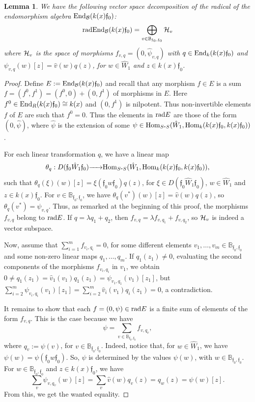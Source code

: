 \documentclass{article}
\newtheorem{lemma}[theorem]{Lemma}
\theoremstyle{definition}
\newcommand{\End}{{ \rm End }}
\newcommand{\Hom}{{ \rm Hom }}
\newcommand{\rad}{{ \rm rad }}
\renewcommand{\frak}{\mathfrak}
\newcommand{\g}{\hbox{-}}
\newcommand{\hueca}[1]{\mathbb{#1}}
\newcommand{\rightmap}[1]{\smash{\mathop{\hbox to 
20pt{\rightarrowfill}}\limits^{#1}}}
\begin{document}
\begin{lemma}\label{L: radEnd(k(x)f0}
We have the following vector space decomposition of the radical of the endomorphism algebra $\End_{\cal B}(k(x)\frak{f}_0)$:
$$\rad\End_{\cal B}(k(x)\frak{f}_0)=\bigoplus_{v\in \hueca{B}_{\frak{f}_0,\frak{f}_0}}{\cal H}_v$$
where ${\cal H}_v$ is the space of morphisms $f_{v,q}=(0,\hat{\psi}_{v,q})$ with $q\in \End_k(k(x)\frak{f}_0)$ and $\psi_{v,q}(w)[z]=\hat{v}(w)q(z)$, for $w\in \hat{W}_1$ and $z\in k(x)\frak{f}_0$. 
\end{lemma}

\begin{proof} Define $E:=\End_{\cal B}(k(x)\frak{f}_0)$  and  recall that any morphism $f\in E$ is a sum $f=(f^0,f^1)=(f^0,0)+(0,f^1)$ of morphisms in $E$. Here $f^0\in \End_R(k(x)\frak{f}_0)\cong k(x)$ and $(0,f^1)$ is nilpotent. 
Thus non-invertible elements $f$ of $E$ are such that $f^0=0$.  Thus the elements in $\rad E$ are those of the form $(0,\hat{\psi})$, where $\hat{\psi}$ is the extension of some $\psi\in \Hom_{S\g S}(\hat{W}_1,\Hom_k(k(x)\frak{f}_0,k(x)\frak{f}_0))$.  

For each linear transformation $q$, we have a linear map 
$$\theta_q:D(\frak{f}_0\hat{W}_1\frak{f}_0)\rightmap{}\Hom_{S\g S}(\hat{W}_1,\Hom_k(k(x)\frak{f}_0,k(x)\frak{f}_0)),$$
  such that $\theta_q(\xi)(w)[z]=\xi(\frak{f}_0w\frak{f}_0)q(z)$, for $\xi\in D(\frak{f}_0\hat{W}_1\frak{f}_0)$, $w\in \hat{W}_1$ and $z\in k(x)\frak{f}_0$. For $v\in \hueca{B}_{\frak{f}_0,\frak{f}_0}$, 
  we have $\theta_q(v^*)(w)[z]=\hat{v}(w)q(z)$, so $\theta_q(v^*)=\psi_{v,q}$. 
Thus, as remarked at the beginning of this proof, the morphisms $f_{v,q}$ belong to $\rad E$. If $q=\lambda q_1+q_2$, then $f_{v,q}=\lambda f_{v,q_1}+f_{v,q_2}$, so ${\cal H}_v$ is indeed a vector subspace. 

Now, assume that $\sum_{i=1}^mf_{v_i,q_i}=0$, for some different elements $v_1,\ldots,v_m\in \hueca{B}_{\frak{f}_0,\frak{f}_0}$ and some non-zero linear maps $q_1,\ldots,q_m$. If $q_1(z_1)\not=0$,  evaluating the second components of the morphisms $f_{v_i,q_i}$ in $v_1$, we obtain 
$0\not=q_1(z_1)=\hat{v}_1(v_1)q_1(z_1)=\psi_{v_1,q_1}(v_1)[z_1]$, but
 $\sum_{i=2}^m\psi_{v_i,q_i}(v_1)[z_1]
=\sum_{i=2}^m\hat{v}_i(v_1)q_i(z_1)=0$, a contradiction.  

It remains to show that each $f=(0,\psi)\in \rad E$ is a finite sum of elements of the form  $f_{v,q}$. This is the case because we have 
$$\psi=\sum_{v\in \hueca{B}_{\frak{f}_0,\frak{f}_0}}f_{v,q_v},$$
where $q_v:=\psi(v)$, for $v\in \hueca{B}_{\frak{f}_0,\frak{f}_0}$. 
Indeed, notice that, for $w\in \hat{W}_1$, we have $\psi(w)=\psi(\frak{f}_0w\frak{f}_0)$. So, $\psi$  is determined by the values $\psi(w)$, with $w\in \hueca{B}_{\frak{f}_0,\frak{f}_0}$. For $w\in \hueca{B}_{\frak{f}_0,\frak{f}_0}$ and $z\in k(x)\frak{f}_0$, we have 
$$\sum_v\psi_{v,q_v}(w)[z]=\sum_v\hat{v}(w)q_v(z)=q_w(z)=\psi(w)[z].$$
From this, we get the wanted equality.
\end{proof}
\end{document}
